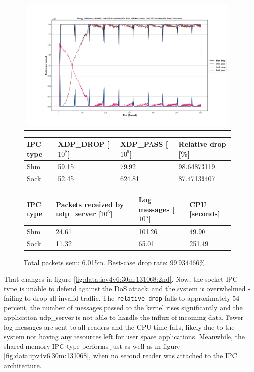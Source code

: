 \begin{figure}[!h]
	\centering
	\scriptsize
	\begin{tabular}{c}
    	\centerline{\includegraphics[width=1.2\textwidth]{images/IPv4v6_20m_2ndReader_1.png}}
	\end{tabular}
	\begin{tabular}{llll}
		\toprule
		\textbf{IPC type} & \textbf{XDP\_DROP [$10^8$]} & \textbf{XDP\_PASS [$10^6$]} & \textbf{Relative drop [\%]} \\ \midrule 
		Shm & 59.15 & 79.92 & 98.64873119 \\
        Sock & 52.45 & 624.81 & 87.47139407 \\
	\bottomrule
	\end{tabular}
    \begin{tabular}{llll}
		\toprule
		\textbf{IPC type} & \textbf{Packets received by udp\_server [$10^6$]} & \textbf{Log messages [$10^5$]} & \textbf{CPU [seconds]} \\ \midrule 
		Shm & 24.61 & 101.26 & 49.90 \\
        Sock & 11.32 & 65.01 & 251.49 \\
	\bottomrule
	\end{tabular}
	\caption[Simplefail2ban with 2nd Reader, IPv4v6, 20m \ac{PPS}, 131,068 malicious clients]{Total packets sent: 6,015m. Best-case drop rate: 99.934466\%}
	\label{fig:data:ipv4v6:20m:131068:2nd}
\end{figure}

That changes in figure \ref{fig:data:ipv4v6:30m:131068:2nd}.
Now, the socket \ac{IPC} type is unable to defend against the \ac{DoS} attack, and the system is overwhelmed - failing to drop all invalid traffic.  
The \texttt{relative drop} falls to approximately 54 percent, the number of messages passed to the kernel rises significantly and the application udp\_server is not able to handle the influx of incoming data.
Fewer log messages are sent to all readers and the \ac{CPU} time falls, likely due to the system not having any resources left for user space applications.
Meanwhile, the shared memory \ac{IPC} type performs just as well as in figure \ref{fig:data:ipv4v6:30m:131068}, when no second reader was attached to the \ac{IPC} architecture.

